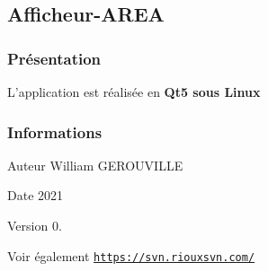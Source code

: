 \hypertarget{page__r_e_a_d_m_e_projet}{}\subsection{Afficheur-\/\+A\+R\+EA}\label{page__r_e_a_d_m_e_projet}
\hypertarget{page__r_e_a_d_m_e_presentation}{}\subsubsection{Présentation}\label{page__r_e_a_d_m_e_presentation}
L’application est réalisée en {\bfseries Qt5 sous Linux}\hypertarget{page__r_e_a_d_m_e_informations}{}\subsubsection{Informations}\label{page__r_e_a_d_m_e_informations}
\begin{DoxyAuthor}{Auteur}
William G\+E\+R\+O\+U\+V\+I\+L\+LE 
\end{DoxyAuthor}
\begin{DoxyDate}{Date}
2021 
\end{DoxyDate}
\begin{DoxyVersion}{Version}
0. 
\end{DoxyVersion}
\begin{DoxySeeAlso}{Voir également}
\href{https://svn.riouxsvn.com/}{\tt https\+://svn.\+riouxsvn.\+com/} 
\end{DoxySeeAlso}
